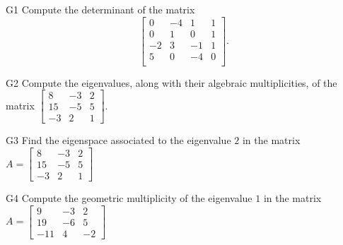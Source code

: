 \documentclass{sbgLAexam}
\begin{document}
\begin{problem}{G1}
Compute the determinant of the matrix
\[
  \begin{bmatrix}
    0 & -4 & 1 & 1 \\
    0 & 1 & 0 & 1 \\
    -2 & 3 & -1 & 1 \\
    5 & 0 & -4 & 0 \\
  \end{bmatrix}
.\]
\end{problem}
\newpage

\begin{problem}{G2}
Compute the eigenvalues, along with their algebraic multiplicities, of the matrix $ \begin{bmatrix} 8 & -3 & 2 \\ 15 & -5 & 5 \\ -3 & 2 & 1 \end{bmatrix}$.
\end{problem}

\begin{problem}{G3}
Find the eigenspace associated to the eigenvalue $2$ in the matrix $A=\begin{bmatrix}8 & -3 & 2 \\ 15 & -5 & 5 \\ -3 & 2 & 1\end{bmatrix}$
\end{problem}
\newpage

\begin{problem}{G4}
Compute the geometric multiplicity of the eigenvalue $1$ in the matrix $A=\begin{bmatrix}9 & -3 & 2 \\ 19 & -6 & 5 \\ -11 & 4 & -2 \end{bmatrix}$
\end{problem}
\end{document}
